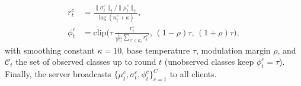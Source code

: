 \begin{align}
r_t^c &= \frac{\|\sigma_t^c\|_2/\|\mu_t^c\|_2}{\log(n_t^c+\kappa)}, \label{eq:raw_conc}\\
\phi_t^c &= \mathrm{clip}\!\Big(\tau\,\frac{r_t^c}{\frac{1}{|\mathcal{C}_t|}\sum_{c'\in\mathcal{C}_t}r_t^{c'}},\,(1-\rho)\tau,\,(1+\rho)\tau\Big), \label{eq:temp_clip}
\end{align}
with smoothing constant $\kappa=10$, base temperature $\tau$, modulation margin $\rho$, and $\mathcal{C}_t$ the set of observed classes up to round $t$ (unobserved classes keep $\phi_t^c=\tau$). Finally, the server broadcasts $\{\mu_t^c,\sigma_t^c,\phi_t^c\}_{c=1}^C$ to all clients.
